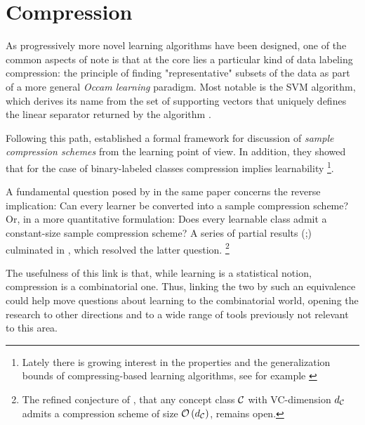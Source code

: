 \documentclass[12pt,a4paper,oneside,onecolumn]{book}
\begin{document}
\section{Compression}
%
%

As progressively more novel learning algorithms have been designed, one of the common aspects of note is that at the core lies a particular kind of data labeling compression: the principle of finding "representative" subsets of the data
as part of a more general \emph{Occam learning} paradigm.
Most notable is the SVM algorithm, which derives its name from the set of supporting vectors that uniquely defines the linear separator returned by the algorithm \citep{cortes1995support}.

%
%

Following this path, \citet{littlestone1986relating} established a formal framework for discussion of \emph{sample compression schemes} from the learning point of view.
In addition, they showed that for the case of binary-labeled classes compression implies learnability\!
\footnote{Lately there is growing interest in the properties and the generalization bounds of compressing-based learning algorithms, see for example \citet{gkn-aistats16, DBLP:journals/ml/GraepelHS05, cummings2016adaptive}}.

A fundamental question
posed by \citet{littlestone1986relating} in the same paper concerns the reverse implication:
Can every learner be converted into a sample compression scheme?
Or, in a more quantitative formulation:
Does every learnable class admit a constant-size
sample compression scheme?
A series of partial results 
(\citet{floyd1989space,helmbold1992learning,DBLP:journals/ml/FloydW95,ben1998combinatorial,DBLP:journals/jmlr/KuzminW07};\citet{DBLP:journals/jcss/RubinsteinBR09,DBLP:journals/jmlr/RubinsteinR12,MR3047077,livni2013honest,moran2017teaching})
culminated in \citet{moran2016sample},
which resolved the latter question.\!
\footnote{
  The refined conjecture of \citet{littlestone1986relating}, that any concept class $\mathcal{C}$ with VC-dimension $d_{\mathcal{C}}$
  admits a compression scheme of size $\mathcal{O}\left(d_{\mathcal{C}}\right)$, remains open.}

The usefulness of this link is that, while learning is a statistical notion, compression is a combinatorial one. 
Thus, linking the two by such an  equivalence could help move questions about learning to the combinatorial world, opening the research to other directions and to a wide range of tools previously not relevant to this area.
\end{document}
